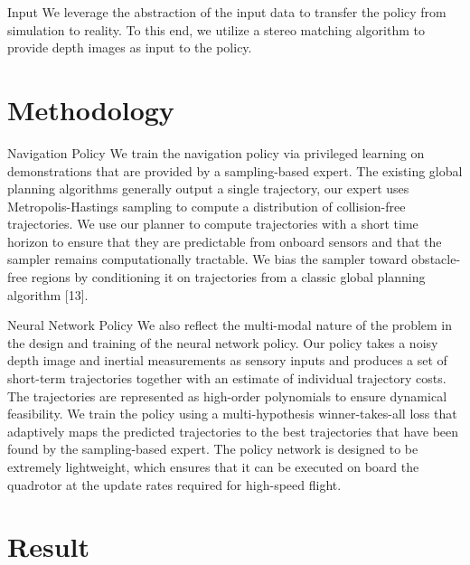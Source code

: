 \documentclass{beamer}
\begin{document}
\begin{frame}{Input}
	We leverage the abstraction of the input data to transfer the policy from simulation to reality. To this end, we utilize a stereo matching algorithm \autocite{stereoMatching} to provide depth images as input to the policy. 
\end{frame}


\section{Methodology}
\begin{frame}{Navigation Policy}
	We train the navigation policy via privileged learning \autocite{Privileged_Learning} on demonstrations that are provided by a sampling-based expert. The existing global planning algorithms \autocite{global_planning} generally output a single trajectory, our expert uses Metropolis-Hastings \autocite{MH_hasting} sampling to compute a distribution of collision-free trajectories. We use our planner to compute trajectories with a short time horizon to ensure that they are predictable from onboard sensors and that the sampler remains computationally tractable. We bias the sampler toward obstacle-free regions by conditioning it on trajectories from a classic global planning algorithm [13].
	
\end{frame}

\begin{frame}{Neural Network Policy}
	We also reflect the multi-modal nature of the problem in the design and training of the neural network policy. Our policy takes a noisy depth image and inertial measurements as sensory inputs and produces a set of short-term trajectories together with an estimate of individual trajectory costs. The trajectories are represented as high-order polynomials to ensure dynamical feasibility. We train the policy using a multi-hypothesis winner-takes-all loss that adaptively maps the predicted trajectories to the best trajectories that have been found by the sampling-based expert. The policy network is designed to be extremely lightweight, which ensures that it can be executed on board the quadrotor at the update rates required for high-speed flight.
	
\end{frame}

\section{Result}
\end{document}
